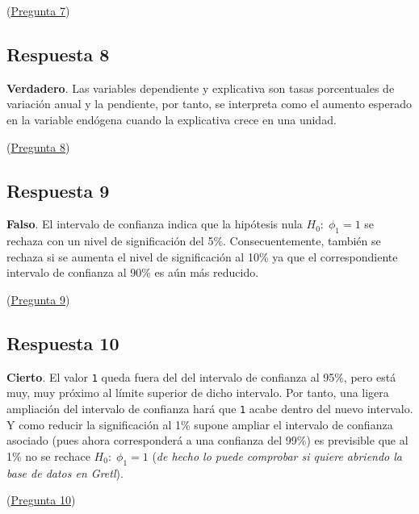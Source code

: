 \documentclass[10pt]{article}
\begin{document}
(\hyperref[sec:orgc0deb0e]{Pregunta 7})
\subsection*{Respuesta 8}
\label{sec:orgfa2e097}

\textbf{Verdadero}. Las variables dependiente y explicativa son tasas
porcentuales de variación anual y la pendiente, por tanto, se
interpreta como el aumento esperado en la variable endógena cuando la
explicativa crece en una unidad.

(\hyperref[sec:orgccf161c]{Pregunta 8})
\subsection*{Respuesta 9}
\label{sec:orga3c1976}

\textbf{Falso}. El intervalo de confianza indica que la hipótesis nula
\(H_0:\; \phi_1=1\) se rechaza con un nivel de significación del
5\%. Consecuentemente, también se rechaza si se aumenta el nivel de
significación al 10\% ya que el correspondiente intervalo de confianza
al 90\% es aún más reducido.

(\hyperref[sec:orgc9e9266]{Pregunta 9})
\subsection*{Respuesta 10}
\label{sec:orga2f43c1}

\textbf{Cierto}. El valor \texttt{1} queda fuera del del intervalo de confianza al
95\%, pero está muy, muy próximo al límite superior de dicho intervalo.
Por tanto, una ligera ampliación del intervalo de confianza hará que
\texttt{1} acabe dentro del nuevo intervalo. Y como reducir la significación
al 1\% supone ampliar el intervalo de confianza asociado (pues ahora
corresponderá a una confianza del 99\%) es previsible que al 1\% no se
rechace \(H_0:\; \phi_1=1\) (\emph{de hecho lo puede comprobar si quiere
abriendo la base de datos en Gretl}).

(\hyperref[sec:org06e548a]{Pregunta 10})
\end{document}

